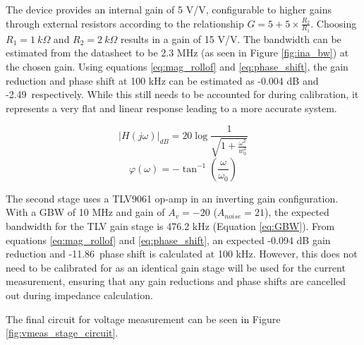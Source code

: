 The device provides an internal gain of 5 V/V, configurable to higher gains through external resistors according to the relationship $G = 5 + 5\times \frac{R_2}{R_1}$. Choosing $R_1=1~k\Omega$ and $R_2=2~k\Omega$ results in a gain of 15 V/V. The bandwidth can be estimated from the datasheet to be 2.3 MHz (as seen in Figure \ref{fig:ina_bw}) at the chosen gain. Using equations \ref{eq:mag_rollof} and \ref{eq:phase_shift}, the gain reduction and phase shift at 100 kHz can be estimated as -0.004 dB and -2.49\textdegree\ respectively. While this still needs to be accounted for during calibration, it represents a very flat and linear response leading to a more accurate system.


\begin{equation}
    |H(j\omega)|_{dB} = 20\log\frac{1}{\sqrt{1+\frac{\omega^2}{w_0^2}}}
    \label{eq:mag_rollof}
\end{equation}
\begin{equation}
    \varphi(\omega) = -\tan^{-1}(\frac{\omega}{\omega_0})
    \label{eq:phase_shift}
\end{equation}


The second stage uses a TLV9061 op-amp in an inverting gain configuration.  With a GBW of 10 MHz and gain of $A_v=-20$ ($A_{noise}=21$), the expected bandwidth for the TLV gain stage is 476.2 kHz (Equation \ref{eq:GBW}). From equations \ref{eq:mag_rollof} and \ref{eq:phase_shift}, an expected -0.094 dB gain reduction and -11.86\textdegree\ phase shift is calculated at 100 kHz. However, this does not need to be calibrated for as an identical gain stage will be used for the current measurement, ensuring that any gain reductions and phase shifts are cancelled out during impedance calculation.

The final circuit for voltage measurement can be seen in Figure \ref{fig:vmeas_stage_circuit}.

